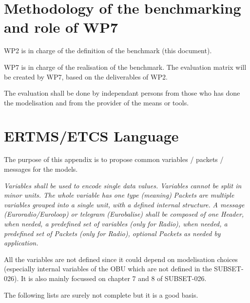 \documentclass{template/openetcs_report}
\begin{document}
\chapter{Methodology of the benchmarking and role of WP7}

WP2 is in charge of the definition of the benchmark (this document).

WP7 is in charge of the realisation of the benchmark. The evaluation matrix will be created by WP7, based on the deliverables of WP2. 

The evaluation shall be done by independant persons from those who has done the modelisation and from the provider of the means or tools.


\nocite{*}




\appendix

\chapter{ERTMS/ETCS Language}

The purpose of this appendix is to propose common variables / packets / messages for the models.

\emph{ Variables shall be used to encode single data values. Variables cannot be split in minor units. The whole variable has one type (meaning)}
\newline
\emph{Packets are multiple variables grouped into a single unit, with a defined internal structure.}
\newline
\emph{A message (Euroradio/Euroloop) or telegram (Eurobalise) shall be composed of one Header, when needed, a predefined set of variables (only for Radio), when needed, a predefined set of Packets (only for Radio), optional Packets as needed by application.}

All the variables are not defined since it could depend on modelisation choices (especially internal variables of the OBU which are not defined in the SUBSET-026). It is also mainly focussed on chapter 7 and 8 of SUBSET-026.

The following lists are surely not complete but it is a good basis.
\end{document}

